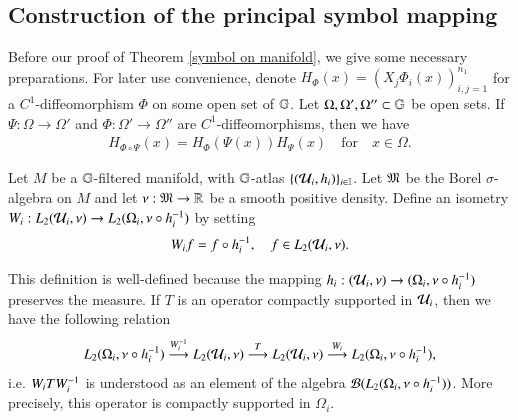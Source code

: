 \documentclass[leqno]{amsart}
\begin{document}
	
	
	
	\subsection{Construction of the principal symbol mapping}
	
	
	
	
	Before our proof of Theorem \ref{symbol on manifold}, we give some necessary preparations. For later use convenience, denote $H_{\Phi}(x)=(X_j\Phi_i(x))_{i,j=1}^{n_{1}}$ for a $C^{1}$-diffeomorphism $\Phi$ on some open set of $\mathbb{G}$. Let $\Omega,\Omega',\Omega''\subset\mathbb{G}$ be open sets. If $\Psi:\Omega\to\Omega'$ and $\Phi:\Omega'\to\Omega''$ are $C^{1}$-diffeomorphisms, then we have
	\begin{align}\label{horizontal Jacobian Leibniz-law}
		H_{\Phi\circ\Psi}(x)=H_{\Phi}(\Psi(x))H_{\Psi}(x)\quad\mbox{for}\quad x\in\Omega.
	\end{align}
	\begin{definition}
		Let $M$ be a $\mathbb{G}$-filtered manifold, with $\mathbb{G}$-atlas $\{({\mathcal U}_{i},h_{i})\}_{i\in\mathbb I}$. Let $\mathfrak M$ be the Borel $\sigma$-algebra on $M$ and let $\nu:\mathfrak M\rightarrow\mathbb{R}$ be a smooth positive density. Define an isometry $W_{i}:L_{2}({\mathcal U}_{i},\nu)\rightarrow L_{2}(\Omega_{i},\nu\circ h_{i}^{-1})$ by setting
		\begin{align*}
			W_{i}f=f\circ h_{i}^{-1},\quad f\in L_{2}({\mathcal U}_{i},\nu).
		\end{align*}
	\end{definition}
	This definition is well-defined because the mapping $h_{i}:({\mathcal U}_{i},\nu)\rightarrow(\Omega_{i},\nu\circ h_{i}^{-1})$ preserves the measure. If $T$ is an operator compactly supported in ${\mathcal U}_{i}$, then we have the following relation %
	$$L_{2}(\Omega_{i},\nu\circ h_{i}^{-1}) \stackrel{W_{i}^{-1}}{\longrightarrow}
	L_{2}({\mathcal U}_{i},\nu) \stackrel{T}{\longrightarrow}
	L_{2}({\mathcal U}_{i},\nu) \stackrel{W_{i}}{\longrightarrow}
	L_{2}(\Omega_{i},\nu\circ h_{i}^{-1}),$$
	i.e. $W_{i}TW_{i}^{-1}$ is understood as an element of the algebra ${\mathcal B}(L_{2}(\Omega_{i},\nu\circ h_{i}^{-1}))$. More precisely, this operator is compactly supported in $\Omega_{i}$.
	
\end{document}
